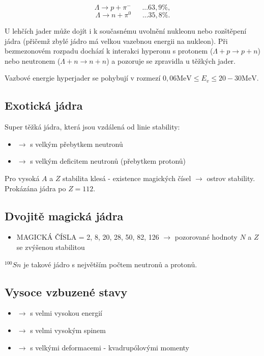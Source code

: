 \documentclass[../../main.tex]{subfiles}
\begin{document}
\begin{equation}
\Lambda \rightarrow p + \pi ^-   ~~~~~~~ ...63,9 \%,
\end{equation}
\begin{equation}
\Lambda \rightarrow n + \pi ^0   ~~~~~~~ ...35,8 \%.
\end{equation}

U lehčích jader může dojít i k současnému uvolnění nukleonu nebo rozštěpení jádra (přičemž zbylé jádro má velkou vazebnou energii na nukleon). Při bezmezonovém rozpadu dochází k interakci hyperonu s protonem ($\Lambda + p \rightarrow p + n$) nebo neutronem ($\Lambda + n \rightarrow n + n$) a pozoruje se zpravidla u těžkých jader. 

Vazbové energie hyperjader se pohybují v rozmezí $0,06 \mathrm{MeV} \leq E_v \leq 20 - 30 \mathrm{MeV}$.

\subsection{Exotická jádra}

Super těžká jádra, která jsou vzdálená od linie stability:
\begin{itemize}
	\item $\rightarrow$ s velkým přebytkem neutronů
	\item $\rightarrow$ s velkým deficitem neutronů (přebytkem protonů)
\end{itemize}
Pro vysoká $A$ a $Z$ stabilita klesá - existence magických čísel $\rightarrow$ ostrov stability. Prokázána jádra po $Z = 112$.

\subsection{Dvojitě magická jádra}
\begin{itemize}
	\item MAGICKÁ ČÍSLA = 2, 8, 20, 28, 50, 82, 126 $\rightarrow$ pozorované hodnoty $N$ a $Z$ se zvýšenou stabilitou
\end{itemize}

$^{100} Sn$ je takové jádro s největším počtem neutronů a protonů.

\subsection{Vysoce vzbuzené stavy}
\begin{itemize}
	\item $\rightarrow$ s velmi vysokou energií
	\item $\rightarrow$ s velmi vysokým spinem
	\item $\rightarrow$ s velkými deformacemi - kvadrupólovými momenty
\end{itemize}
\end{document}
